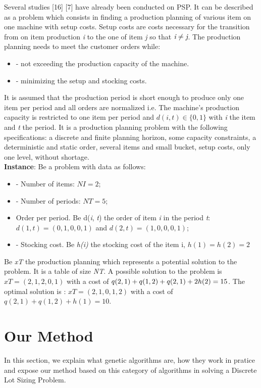 \documentclass[twocolumn,10pt]{asme2ej}
\begin{document}
Several studies [16] [7] have already been conducted on PSP. It can be described as a problem which consists in finding a production planning of various item on one machine with setup costs. Setup costs are costs necessary for the transition from on item production \emph{i} to the one of item \emph{j} so that $ \emph{i} \neq \emph{j} $. The production planning needs to meet the customer orders while:
\begin{itemize}
  \item - not exceeding the production capacity of the machine.
  \item - minimizing the setup and stocking costs.
\end{itemize}
It is assumed that the production period is short enough to produce only one item per period and all orders are normalized i.e. The machine's production capacity is restricted to one item per period and $ d(i, t) \in \{0, 1\} $ with \emph{i} the item and \emph{t} the period. It is a production planning problem with the following specifications: a discrete and finite planning horizon, some capacity constraints, a deterministic and static order, several items and small bucket, setup costs, only one level, without shortage.\\

\textbf{Instance}: Be a problem with data as follows:
\begin{itemize}
    \item - Number of items: $ NI = 2 $;
    \item - Number of periods: $ NT = 5 $;
    \item Order per period. Be d(\emph{i}, \emph{t}) the order of item \emph{i} in the period \emph{t}: $ d(1, t ) = (0, 1, 0, 0, 1) $ and $ d(2, t) = (1, 0, 0, 0, 1)$; 
    \item - Stocking cost. Be \emph{h(i)} the stocking cost of the item i, $ h(1) = h(2) = 2 $
\end{itemize}

    Be \emph{xT} the production planning which represents a potential solution to the problem. It is a table of size \emph{NT}. A possible solution to the problem is $ xT = (2, 1, 2, 0, 1) $ with a cost of $ q(2, 1) + q(1, 2) + q(2, 1) + 2 \* h(2) = 15 $. The optimal solution is : $ xT = (2, 1, 0, 1, 2) $ with a cost of $ q(2, 1) + q(1, 2) + h(1) = 10 $.




\section{Our Method}
In this section, we explain what genetic algorithms are, how they work in pratice and expose our method based on this category of algorithms in solving a Discrete Lot Sizing Problem.
\end{document}
